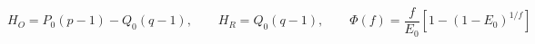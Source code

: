 \documentclass[12pt]{article}
\begin{document}
\fontsize{22}{28}\selectfont\[H_O=P_0(p-1)-Q_0(q-1),\qquad H_R=Q_0(q-1),\qquad \Phi(f)=\frac{f}{E_0}\left[1-(1-E_0)^{1/f}\right]\]
\end{document}
